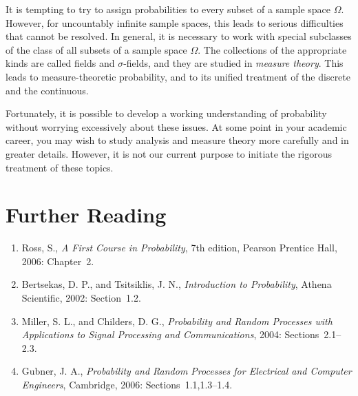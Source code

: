 It is tempting to try to assign probabilities to every subset of a sample space $\Omega$.
However, for uncountably infinite sample spaces, this leads to serious difficulties that cannot be resolved.
In general, it is necessary to work with special subclasses of the class of all subsets of a sample space $\Omega$.
The collections of the appropriate kinds are called fields and $\sigma$-fields, and they are studied in \emph{measure theory}.
This leads to measure-theoretic probability, and to its unified treatment of the discrete and the continuous.

Fortunately, it is possible to develop a working understanding of probability without worrying excessively about these issues.
At some point in your academic career, you may wish to study analysis and measure theory more carefully and in greater details.
However, it is not our current purpose to initiate the rigorous treatment of these topics.


\section*{Further Reading}

\begin{small}
\begin{enumerate}
\item Ross, S., \emph{A First Course in Probability}, 7th edition, Pearson Prentice Hall, 2006: Chapter~2.
\item Bertsekas, D. P., and Tsitsiklis, J. N., \emph{Introduction to Probability}, Athena Scientific, 2002: Section~1.2.
\item Miller, S. L., and Childers, D. G., \emph{Probability and Random Processes with Applications to Signal Processing and Communications}, 2004: Sections~2.1--2.3.
\item Gubner, J. A., \emph{Probability and Random Processes for Electrical and Computer Engineers}, Cambridge, 2006: Sections~1.1,1.3--1.4.
\end{enumerate}
\end{small}

